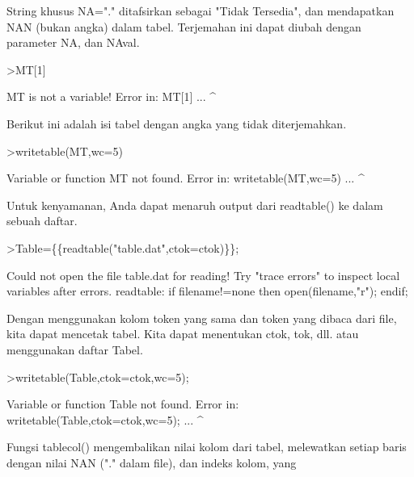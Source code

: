 \documentclass[a4paper,10pt]{article}
\begin{document}
\begin{eulernotebook}
\begin{eulercomment}
String khusus NA="." ditafsirkan sebagai "Tidak Tersedia", dan
mendapatkan NAN (bukan angka) dalam tabel. Terjemahan ini dapat diubah
dengan parameter NA, dan NAval.
\end{eulercomment}
\begin{eulerprompt}
>MT[1]
\end{eulerprompt}
\begin{euleroutput}
  MT is not a variable!
  Error in:
  MT[1] ...
       ^
\end{euleroutput}
\begin{eulercomment}
Berikut ini adalah isi tabel dengan angka yang tidak diterjemahkan.
\end{eulercomment}
\begin{eulerprompt}
>writetable(MT,wc=5)
\end{eulerprompt}
\begin{euleroutput}
  Variable or function MT not found.
  Error in:
  writetable(MT,wc=5) ...
               ^
\end{euleroutput}
\begin{eulercomment}
Untuk kenyamanan, Anda dapat menaruh output dari readtable() ke dalam
sebuah daftar.
\end{eulercomment}
\begin{eulerprompt}
>Table=\{\{readtable("table.dat",ctok=ctok)\}\};
\end{eulerprompt}
\begin{euleroutput}
  Could not open the file
  table.dat
  for reading!
  Try "trace errors" to inspect local variables after errors.
  readtable:
      if filename!=none then open(filename,"r"); endif;
\end{euleroutput}
\begin{eulercomment}
Dengan menggunakan kolom token yang sama dan token yang dibaca dari
file, kita dapat mencetak tabel. Kita dapat menentukan ctok, tok, dll.
atau menggunakan daftar Tabel.
\end{eulercomment}
\begin{eulerprompt}
>writetable(Table,ctok=ctok,wc=5);
\end{eulerprompt}
\begin{euleroutput}
  Variable or function Table not found.
  Error in:
  writetable(Table,ctok=ctok,wc=5); ...
                  ^
\end{euleroutput}
\begin{eulercomment}
Fungsi tablecol() mengembalikan nilai kolom dari tabel, melewatkan
setiap baris dengan nilai NAN ("." dalam file), dan indeks kolom, yang

\end{eulercomment}
\end{eulernotebook}
\end{document}
